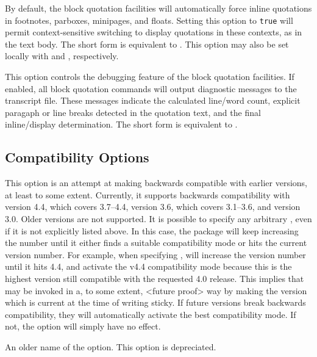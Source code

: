 \documentclass{ltxdockit}[2010/09/26]
\begin{document}
\begin{optionlist}

By default, the block quotation facilities will automatically force inline quotations in footnotes, parboxes, minipages, and floats. Setting this option to \texttt{true} will permit context-sensitive switching to display quotations in these contexts, as in the text body. The short form  is equivalent to . This option may also be set locally with  and , respectively.


This option controls the debugging feature of the block quotation facilities. If enabled, all block quotation commands will output diagnostic messages to the transcript file. These messages indicate the calculated line\slash word count, explicit paragaph or line breaks detected in the quotation text, and the final inline\slash display determination. The short form  is equivalent to .

\end{optionlist}

\subsection{Compatibility Options}
\label{opt:leg}

\begin{optionlist}


This option is an attempt at making  backwards compatible with earlier versions, at least to some extent. Currently, it supports backwards compatibility with version 4.4, which covers 3.7--4.4, version 3.6, which covers 3.1--3.6, and version 3.0. Older versions are not supported. It is possible to specify any arbitrary , even if it is not explicitly listed above. In this case, the package will keep increasing the  number until it either finds a suitable compatibility mode or hits the current version number. For example, when specifying ,  will increase the version number until it hits 4.4, and activate the v4.4 compatibility mode because this is the highest version still compatible with the requested 4.0 release. This implies that  may be invoked in a, to some extent, <future proof> way by making the version which is current at the time of writing sticky. If future versions break backwards compatibility, they will automatically activate the best compatibility mode. If not, the  option will simply have no effect.


An older name of the  option. This option is depreciated.

\end{optionlist}
\end{document}
